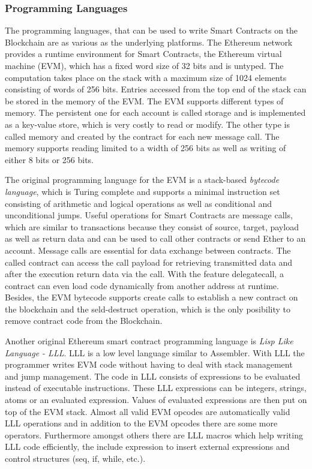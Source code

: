 \documentclass[conference]{IEEEtran}
\begin{document}
\subsubsection{Programming Languages}
The programming languages, that can be used to write Smart Contracts on the Blockchain are as various as the underlying platforms. The Ethereum network provides a runtime environment for Smart Contracts, the Ethereum virtual machine (EVM), which has a fixed word size of 32 bits and is untyped. The computation takes place on the stack with a maximum size of 1024 elements consisting of words of 256 bits. Entries accessed from the top end of the stack can be stored in the memory of the EVM. The EVM supports different types of memory. The persistent one for each account is called storage and is implemented as a key-value store, which is very costly to read or modify. The other type is called memory and created by the contract for each new message call. The memory supports reading limited to a width of 256 bits as well as writing of either 8 bits or 256 bits. \cite{Solidity2017} \par 
The original programming language for the EVM is a stack-based \textit{bytecode language}, which is Turing complete and supports a minimal instruction set consisting of arithmetic and logical operations as well as conditional and unconditional jumps. Useful operations for Smart Contracts are message calls, which are similar to transactions because they consist of source, target, payload as well as return data and can be used to call other contracts or send Ether to an account. Message calls are essential for data exchange between contracts. The called contract can access the call payload for retrieving transmitted data and after the execution return data via the call. With the feature delegatecall, a contract can even load code dynamically from another address at runtime. Besides, the EVM bytecode supports create calls to establish a new contract on the blockchain and the seld-destruct operation, which is the only posibility to remove contract code from the Blockchain. \cite{Bartoletti2017} \cite{McAdams2017} \cite{Solidity2017}\par 
Another original Ethereum smart contract programming language is \textit{Lisp Like Language - LLL}. LLL is a low level language similar to Assembler. With LLL the programmer writes EVM code without having to deal with stack management and jump management. The code in LLL consists of expressions to be evaluated instead of executable instructions. These LLL expressions can be integers, strings, atoms or an evaluated expression. Values of evaluated expressions are then put on top of the EVM stack. Almost all valid EVM opcodes are automatically valid LLL operations and in addition to the EVM opcodes there are some more operators. Furthermore amongst others there are LLL macros which help writing LLL code efficiently, the include expression to insert external expressions and control structures (seq, if, while, etc.). \cite{Edgington2017} \par 
\end{document}
